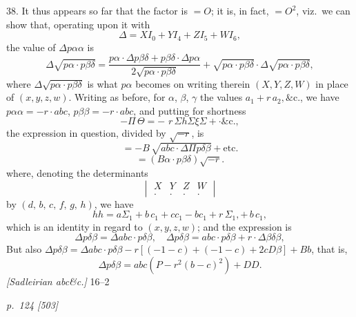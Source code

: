 \documentclass[11pt,a4paper]{book}
\begin{document}
38. It thus appears so far that the factor is $= O$; it is, in fact, $= O^2$, viz.\ we
can show that, operating upon it with
\[
\Delta = X I_0 + Y I_4 + Z I_5 + W I_6,
\]
the value of $\Delta p\alpha\alpha$ is
\[
\Delta\sqrt{p\alpha\cdot p\beta\delta} = \frac{p\alpha\cdot\Delta p\beta\delta + p\beta\delta\cdot\Delta p\alpha}{2\sqrt{p\alpha\cdot p\beta\delta}}
+ \sqrt{p\alpha\cdot p\beta\delta}\cdot\Delta\sqrt{p\alpha\cdot p\beta\delta},
\]
where $\Delta\sqrt{p\alpha\cdot p\beta\delta}$ is what $p\alpha$ becomes on writing therein $(X, Y, Z, W)$ in place of
$(x, y, z, w)$. Writing as before, for $\alpha$, $\beta$, $\gamma$ the values $a_1 + r\,a_2, \&\text{c.}$, we have
$p\alpha\alpha = -r\cdot abc$, $p\beta\beta = -r\cdot abc$, and putting for shortness
\[
-\Pi\,\Theta = -\,\,r\,\Sigma h\Sigma\xi\Sigma+ \cdot \&\text{c.},
\]
the expression in question, divided by $\sqrt{-r}$, is
\[
= -B\,\sqrt{abc\cdot\Delta\Pi p\delta\beta}+\text{etc.}
\]
\[
= (B\alpha\cdot p\beta\delta)\sqrt{-r}.
\]
where, denoting the determinants
\[
\begin{vmatrix}
X & Y & Z & W \\
. & . & . & .
\end{vmatrix}
\]
by $(d,\,b,\,c,\,f,\,g,\,h)$, we have
\[
hh = a\Sigma_1 + b\,c_1 + cc_1 - bc_1 + r\,\Sigma_1, +\,b\,c_1,
\]
which is an identity in regard to $(x, y, z, w)$; and the expression is
\[
\Delta p\delta\beta = \Delta abc \cdot p\delta\beta, \quad \Delta p\delta\beta = abc \cdot p\delta\beta + r\cdot\Delta\beta\delta\beta,
\]
But also $\Delta p\delta\beta = \Delta abc \cdot p\delta\beta - r [(-1 - c) + (-1 - c) + 2cD\beta] + Bb$, that is,
\[
\Delta p\delta\beta = abc(P - r^2(b - c)^2) + DD.
\]
\textit{[Sadleirian abc\&c.]} \hfill 16--2

\clearpage

\bigskip
\textit{p.~124 [503]}
\smallskip
\end{document}
